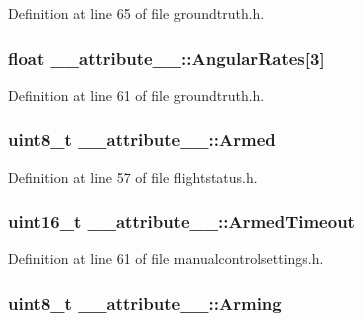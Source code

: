 \-Definition at line 65 of file groundtruth.\-h.

\hypertarget{struct____attribute_____acb1d79cf5cda5ce006ba0440e19ce509}{
\subsubsection[{\-Angular\-Rates}]{\setlength{\rightskip}{0pt plus 5cm}float {\bf \-\_\-\-\_\-attribute\-\_\-\-\_\-\-::\-Angular\-Rates}\mbox{[}3\mbox{]}}}\label{struct____attribute_____acb1d79cf5cda5ce006ba0440e19ce509}


\-Definition at line 61 of file groundtruth.\-h.

\hypertarget{struct____attribute_____aceb2027e5cc4bcba87a4b4dae2c6ca47}{
\subsubsection[{\-Armed}]{\setlength{\rightskip}{0pt plus 5cm}uint8\-\_\-t {\bf \-\_\-\-\_\-attribute\-\_\-\-\_\-\-::\-Armed}}}\label{struct____attribute_____aceb2027e5cc4bcba87a4b4dae2c6ca47}


\-Definition at line 57 of file flightstatus.\-h.

\hypertarget{struct____attribute_____a6b5ac915a71f39fe54514fe9b2382227}{
\subsubsection[{\-Armed\-Timeout}]{\setlength{\rightskip}{0pt plus 5cm}uint16\-\_\-t {\bf \-\_\-\-\_\-attribute\-\_\-\-\_\-\-::\-Armed\-Timeout}}}\label{struct____attribute_____a6b5ac915a71f39fe54514fe9b2382227}


\-Definition at line 61 of file manualcontrolsettings.\-h.

\hypertarget{struct____attribute_____a53a8bb9ad74e2e89065b854a25e52583}{
\subsubsection[{\-Arming}]{\setlength{\rightskip}{0pt plus 5cm}uint8\-\_\-t {\bf \-\_\-\-\_\-attribute\-\_\-\-\_\-\-::\-Arming}}}\label{struct____attribute_____a53a8bb9ad74e2e89065b854a25e52583}


